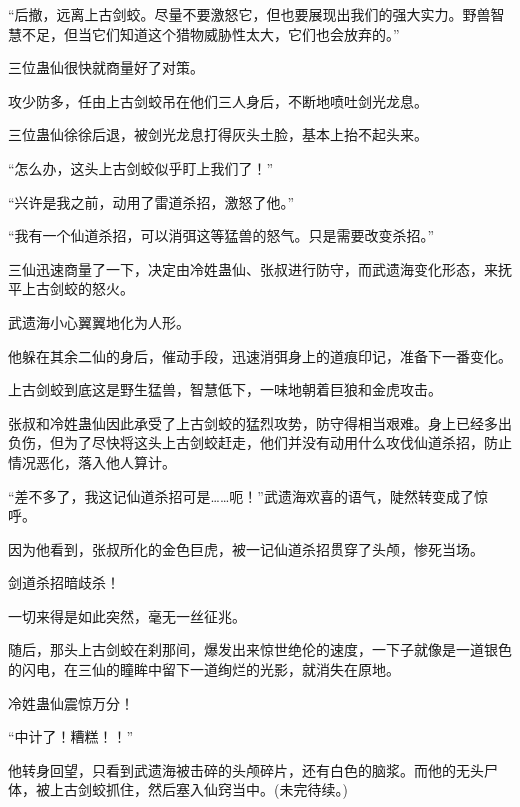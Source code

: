 \begin{this_body}
“后撤，远离上古剑蛟。尽量不要激怒它，但也要展现出我们的强大实力。野兽智慧不足，但当它们知道这个猎物威胁性太大，它们也会放弃的。”

三位蛊仙很快就商量好了对策。

攻少防多，任由上古剑蛟吊在他们三人身后，不断地喷吐剑光龙息。

三位蛊仙徐徐后退，被剑光龙息打得灰头土脸，基本上抬不起头来。

“怎么办，这头上古剑蛟似乎盯上我们了！”

“兴许是我之前，动用了雷道杀招，激怒了他。”

“我有一个仙道杀招，可以消弭这等猛兽的怒气。只是需要改变杀招。”

三仙迅速商量了一下，决定由冷姓蛊仙、张叔进行防守，而武遗海变化形态，来抚平上古剑蛟的怒火。

武遗海小心翼翼地化为人形。

他躲在其余二仙的身后，催动手段，迅速消弭身上的道痕印记，准备下一番变化。

上古剑蛟到底这是野生猛兽，智慧低下，一味地朝着巨狼和金虎攻击。

张叔和冷姓蛊仙因此承受了上古剑蛟的猛烈攻势，防守得相当艰难。身上已经多出负伤，但为了尽快将这头上古剑蛟赶走，他们并没有动用什么攻伐仙道杀招，防止情况恶化，落入他人算计。

“差不多了，我这记仙道杀招可是……呃！”武遗海欢喜的语气，陡然转变成了惊呼。

因为他看到，张叔所化的金色巨虎，被一记仙道杀招贯穿了头颅，惨死当场。

剑道杀招暗歧杀！

一切来得是如此突然，毫无一丝征兆。

随后，那头上古剑蛟在刹那间，爆发出来惊世绝伦的速度，一下子就像是一道银色的闪电，在三仙的瞳眸中留下一道绚烂的光影，就消失在原地。

冷姓蛊仙震惊万分！

“中计了！糟糕！！”

他转身回望，只看到武遗海被击碎的头颅碎片，还有白色的脑浆。而他的无头尸体，被上古剑蛟抓住，然后塞入仙窍当中。(未完待续。)

\end{this_body}

